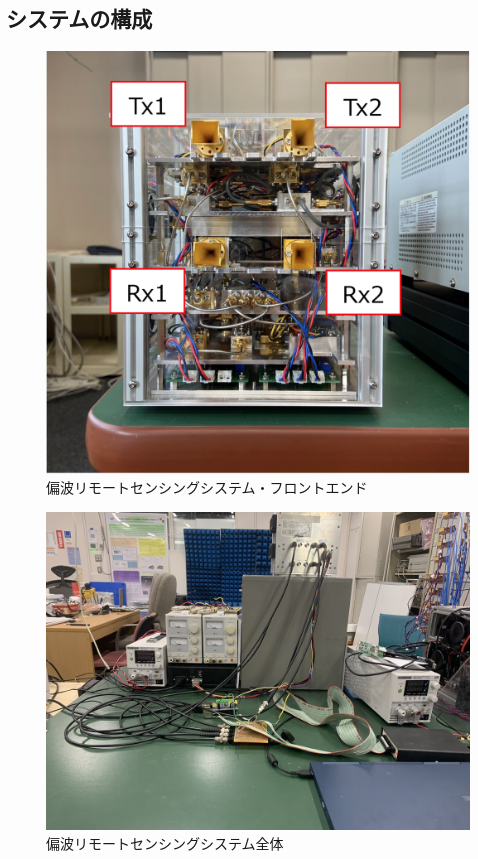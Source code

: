 \documentclass[uplatex,a4paper,12pt]{jsarticle}
\begin{document}
\subsection{システムの構成}
\begin{figure}[hbtp]
	\centering
	\includegraphics[scale=0.3]{../img/system.png}
    \caption{偏波リモートセンシングシステム・フロントエンド}
	\label{fig:system}
\end{figure}
\begin{figure}[hbtp]
	\centering
	\includegraphics[scale=0.1]{../img/system_all.jpeg}
    \caption{偏波リモートセンシングシステム全体}
	\label{fig:system_all}
\end{figure}
\end{document}
